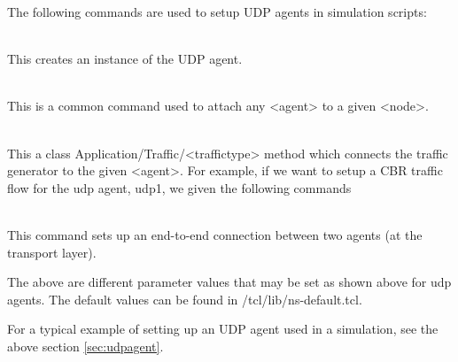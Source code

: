 The following commands are used to setup UDP agents in simulation scripts:
\begin{flushleft}
\\
This creates an instance of the UDP agent.


\\
This is a common command used to attach any <agent> to a given <node>.


\\
This a class Application/Traffic/<traffictype> method which connects the
traffic generator to the given <agent>. For example, if we want to setup
a CBR traffic flow for the udp agent, udp1, we given the following commands\\


\\
This command sets up an end-to-end connection between two agents (at the
transport layer).



The above are different parameter values that may be set as shown above
for udp agents. The default values can be found in 
\ns/tcl/lib/ns-default.tcl.

For a typical example of setting up an UDP agent used in a simulation, see
the above section \ref{sec:udpagent}.

\end{flushleft}

\endinput
